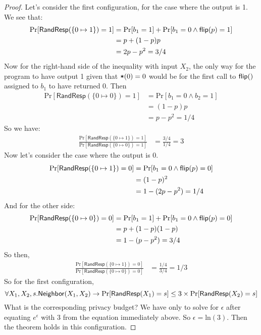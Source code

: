 \documentclass[11pt,twoside]{scrartcl}
\begin{document}
\begin{proof}
Let's consider the first configuration, for the case where the output is 1. We see that:
\begin{align*}
\mathrm{Pr}[\mathsf{RandResp}(\{0 \mapsto 1\}) = 1] &= \mathrm{Pr}[b_1 = 1] + \mathrm{Pr}[b_1 = 0 \land \mathsf{flip}(p) = 1] \\
&=
p + (1-p)p \\
&= 
2p - p^2
=
3/4
\end{align*}
Now for the right-hand side of the inequality with input $X_2$, the only way for the program to have output 1 given that $\texttt{\upshape *}(0) = 0$ would be for the first call to $\mathsf{flip}()$ assigned to $b_1$ to have returned 0. Then
\begin{align*}
\mathrm{Pr}[\mathsf{RandResp}(\{0 \mapsto 0\}) = 1] &= \mathrm{Pr}[b_1 = 0 \land b_2 = 1] \\
&=
(1-p)p \\
&= 
p - p^2
=
1/4
\end{align*}
So we have:
\begin{align*}
\frac{\mathrm{Pr}[\mathsf{RandResp}(\{0 \mapsto 1\}) = 1]}{\mathrm{Pr}[\mathsf{RandResp}(\{0 \mapsto 0\}) = 1]} &=
\frac{3/4}{1/4} =
3
\end{align*}
Now let's consider the case where the output is 0.
\begin{align*}
\mathrm{Pr}[\mathsf{RandResp}(\{0 \mapsto 1\}) = 0] &= \mathrm{Pr}[b_1 = 0 \land \mathsf{flip}(p) = 0] \\
&=
(1-p)^2 \\
&=
1-(2p-p^2) = 1/4
\end{align*}
And for the other side:
\begin{align*}
\mathrm{Pr}[\mathsf{RandResp}(\{0 \mapsto 0\}) = 0] &= \mathrm{Pr}[b_1 = 1] + \mathrm{Pr}[b_1 = 0 \land \mathsf{flip}(p) = 0] \\
&=
p + (1-p)(1-p) \\
&=
1 - (p - p^2) = 3/4
\end{align*}
So then,
\begin{align*}
\frac{\mathrm{Pr}[\mathsf{RandResp}(\{0 \mapsto 1\}) = 0]}{\mathrm{Pr}[\mathsf{RandResp}(\{0 \mapsto 0\}) = 0]} &=
\frac{1/4}{3/4} =
1/3
\end{align*}
So for the first configuration,
\begin{equation*}
\forall X_1, X_2, s. \mathsf{Neighbor}(X_1,X_2) \rightarrow
\mathrm{Pr}[\mathsf{RandResp}(X_1) = s] \le 3\times \mathrm{Pr}[\mathsf{RandResp}(X_2) = s]
\end{equation*}
What is the corresponding privacy budget? We have only to solve for $\epsilon$ after equating $e^\epsilon$ with $3$ from the equation immediately above. So $\epsilon = \mathrm{ln}(3)$. Then the theorem holds in this configuration.


\end{proof}
\end{document}
